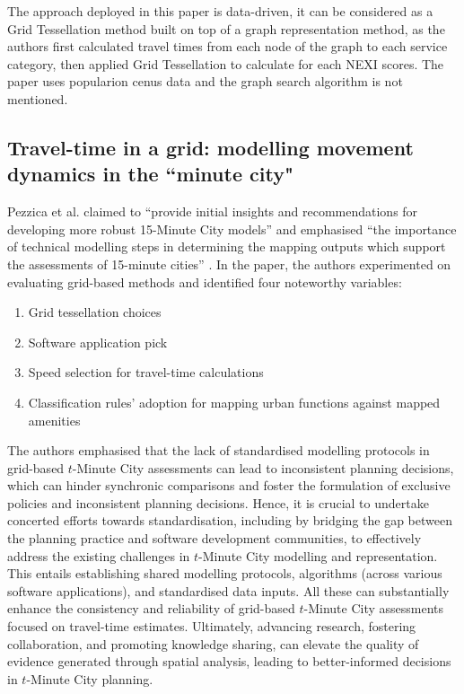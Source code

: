The approach deployed in this paper is data-driven, it can be considered as a Grid Tessellation method built on top of a graph representation method, as the authors first calculated travel times from each node of the graph to each service category, then applied Grid Tessellation to calculate for each NEXI scores. The paper uses popularion cenus data and the graph search algorithm is not mentioned.

\subsection{Travel-time in a grid: modelling movement dynamics in the ``minute city"}

Pezzica et al. claimed to ``provide initial insights and recommendations for developing more robust 15-Minute City models” and emphasised “the importance of technical modelling steps in determining the mapping outputs which support the assessments of 15-minute cities” \cite{Pezzica_Altafini_Mara_Chioni_2024}. In the paper, the authors experimented on evaluating grid-based methods and identified four noteworthy variables:

\begin{enumerate}
    \item Grid tessellation choices
    \item Software application pick
    \item Speed selection for travel-time calculations
    \item Classification rules' adoption for mapping urban functions against mapped amenities
\end{enumerate}

The authors emphasised that the lack of standardised modelling protocols in grid-based $t$-Minute City assessments can lead to inconsistent planning decisions, which can hinder synchronic comparisons and foster the formulation of exclusive policies and inconsistent planning decisions. Hence, it is crucial to undertake concerted efforts towards standardisation, including by bridging the gap between the planning practice and software development communities, to effectively address the existing challenges in $t$-Minute City modelling and representation. This entails establishing shared modelling protocols, algorithms (across various software applications), and standardised data inputs. All these can substantially enhance the consistency and reliability of grid-based $t$-Minute City assessments focused on travel-time estimates. Ultimately, advancing research, fostering collaboration, and promoting knowledge sharing, can elevate the quality of evidence generated through spatial analysis, leading to better-informed decisions in $t$-Minute City planning.

